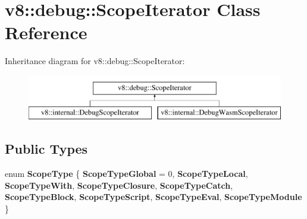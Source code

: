 \hypertarget{classv8_1_1debug_1_1ScopeIterator}{}\section{v8\+:\+:debug\+:\+:Scope\+Iterator Class Reference}
\label{classv8_1_1debug_1_1ScopeIterator}
Inheritance diagram for v8\+:\+:debug\+:\+:Scope\+Iterator\+:\begin{figure}[H]
\begin{center}
\leavevmode
\includegraphics[height=2.000000cm]{classv8_1_1debug_1_1ScopeIterator}
\end{center}
\end{figure}
\subsection*{Public Types}
\begin{DoxyCompactItemize}
\item 
\mbox{\label{classv8_1_1debug_1_1ScopeIterator_af260ab9b643c76c1adf63339eb8ebc9d}} 
enum {\bfseries Scope\+Type} \{ \newline
{\bfseries Scope\+Type\+Global} = 0, 
{\bfseries Scope\+Type\+Local}, 
{\bfseries Scope\+Type\+With}, 
{\bfseries Scope\+Type\+Closure}, 
\newline
{\bfseries Scope\+Type\+Catch}, 
{\bfseries Scope\+Type\+Block}, 
{\bfseries Scope\+Type\+Script}, 
{\bfseries Scope\+Type\+Eval}, 
\newline
{\bfseries Scope\+Type\+Module}
 \}
\end{DoxyCompactItemize}
